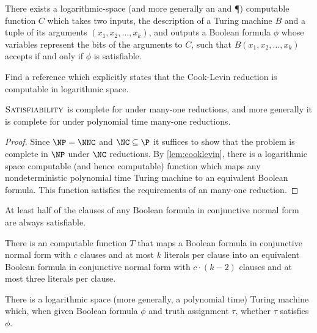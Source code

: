 \documentclass[]{article}
\begin{document}
\begin{lemma}\label{lem:cooklevin}
  There exists a logarithmic-space (and more generally an \NC{} and \P) computable function $C$ which takes two inputs, the description of a Turing machine $B$ and a tuple of its arguments $(x_1, x_2, \dotsc, x_k)$, and outputs a Boolean formula $\phi$ whose variables represent the bits of the arguments to $C$, such that $B(x_1, x_2, \dotsc, x_k)$ accepts if and only if $\phi$ is satisfiable.
\end{lemma}

\begin{todo}
  Find a reference which explicitly states that the Cook-Levin reduction is computable in logarithmic space.
\end{todo}

\begin{lemma}\label{lem:satisnnccomplete}
  $\textsc{Satisfiability}$ is complete for \NNC{} under \NC{} many-one reductions, and more generally it is complete for \NP{} under polynomial time many-one reductions.
\end{lemma}
\begin{proof}
  Since $\NP = \NNC$ and $\NC \subseteq \P$ it suffices to show that the problem is complete in $\NP$ under $\NC$ reductions.
  By \autoref{lem:cooklevin}, there is a logarithmic space computable (and hence \NC{} computable) function which maps any nondeterministic polynomial time Turing machine to an equivalent Boolean formula.
  This function satisfies the requirements of an \NC{} many-one reduction.
\end{proof}

\begin{lemma}\label{lem:half}
 At least half of the clauses of any Boolean formula in conjunctive normal form are always satisfiable.
\end{lemma}

\begin{lemma}\label{lem:three}
  There is an \NC{} computable function $T$ that maps a Boolean formula in conjunctive normal form with $c$ clauses and at most $k$ literals per clause into an equivalent Boolean formula in conjunctive normal form with $c \cdot (k - 2)$ clauses and at most three literals per clause.
\end{lemma}

\begin{lemma}\label{lem:evaluation}
  There is a logarithmic space (more generally, a polynomial time) Turing machine which, when given Boolean formula $\phi$ and truth assignment $\tau$, whether $\tau$ satisfies $\phi$.
\end{lemma}
\end{document}
